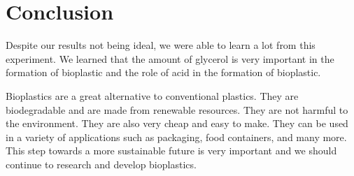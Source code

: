\documentclass[a4paper, 12pt, english]{article}
\begin{document}
\section{Conclusion}
Despite our results not being ideal, we were able to learn a lot from this
experiment. We learned that the amount of glycerol is very important in the
formation of bioplastic and the role of acid in the formation of bioplastic.

Bioplastics are a great alternative to conventional plastics. They are
biodegradable and are made from renewable resources. They are not harmful to
the environment. They are also very cheap and easy to make. They can be used in
a variety of applications such as packaging, food containers, and many more.
This step towards a more sustainable future is very important and we should
continue to research and develop bioplastics.
\end{document}
